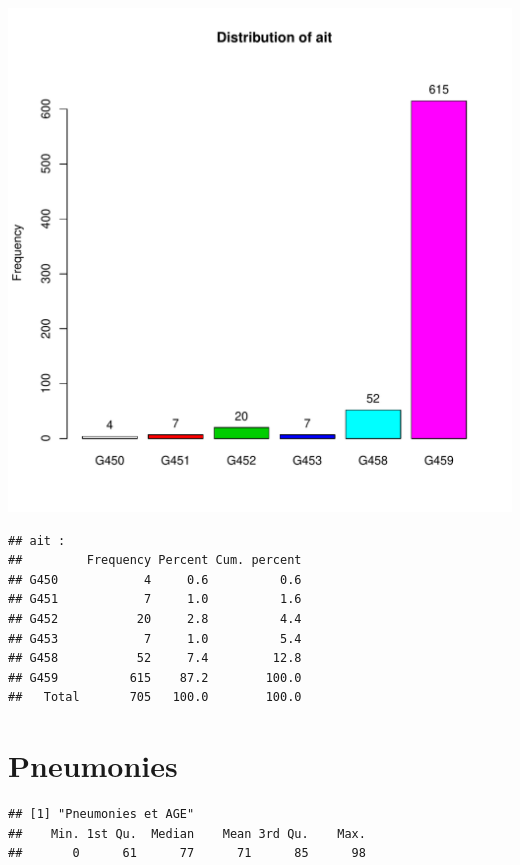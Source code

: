 \documentclass[12pt,english,french,twoside]{book}\usepackage[]{graphicx}\usepackage[]{color}
\makeatletter
\def\maxwidth{ %
  \ifdim\Gin@nat@width>\linewidth
    \linewidth
  \else
    \Gin@nat@width
  \fi
}
\newenvironment{kframe}{%
 \def\at@end@of@kframe{}%
 \ifinner\ifhmode%
  \def\at@end@of@kframe{\end{minipage}}%
  \begin{minipage}{\columnwidth}%
 \fi\fi%
 \def\FrameCommand##1{\hskip\@totalleftmargin \hskip-\fboxsep
 \colorbox{shadecolor}{##1}\hskip-\fboxsep
     \hskip-\linewidth \hskip-\@totalleftmargin \hskip\columnwidth}%
 \MakeFramed {\advance\hsize-\width
   \@totalleftmargin\z@ \linewidth\hsize
   \@setminipage}}%
 {\par\unskip\endMakeFramed%
 \at@end@of@kframe}
\newenvironment{knitrout}{}{} %
\makeatother
\begin{document}
\begin{knitrout}
\color{fgcolor}
\includegraphics[width=\maxwidth]{figure/ait} 
\begin{kframe}\begin{verbatim}
## ait :  
##         Frequency Percent Cum. percent
## G450            4     0.6          0.6
## G451            7     1.0          1.6
## G452           20     2.8          4.4
## G453            7     1.0          5.4
## G458           52     7.4         12.8
## G459          615    87.2        100.0
##   Total       705   100.0        100.0
\end{verbatim}
\end{kframe}
\end{knitrout}


\section{Pneumonies}

\begin{knitrout}
\color{fgcolor}\begin{kframe}


{\ttfamily\noindent\bfseries\color{errorcolor}{\#\# Error: there is no package called 'epitools'}}

{\ttfamily\noindent\color{warningcolor}{\#\# Warning: impossible d'ouvrir le fichier '../mes\_fonctions.R' : Aucun fichier ou dossier de ce type}}

{\ttfamily\noindent\bfseries\color{errorcolor}{\#\# Error: impossible d'ouvrir la connexion}}\begin{verbatim}
## [1] "Pneumonies et AGE"
##    Min. 1st Qu.  Median    Mean 3rd Qu.    Max. 
##       0      61      77      71      85      98
\end{verbatim}
\end{kframe}
\end{knitrout}
\end{document}
